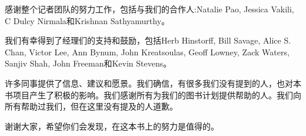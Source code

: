 感谢整个记者团队的努力工作，包括与我们的合作人:Natalie Pao, Jessica Vakili, C Dulcy Nirmala和Krishnan Sathyamurthy。\par

我们有幸得到了经理们的支持和鼓励，包括Herb Hinstorff, Bill Savage, Alice S. Chan, Victor Lee, Ann Bynum, John Kreatsoulas, Geoff Lowney, Zack Waters, Sanjiv Shah, John Freeman和Kevin Stevens。\par

许多同事提供了信息、建议和愿景。我们确信，有很多我们没有提到的人，也对本书项目产生了积极的影响。我们感谢所有为我们的图书计划提供帮助的人。我们向所有帮助过我们，但在这里没有提及的人道歉。\par

谢谢大家，希望你们会发现，在这本书上的努力是值得的。\par

\newpage